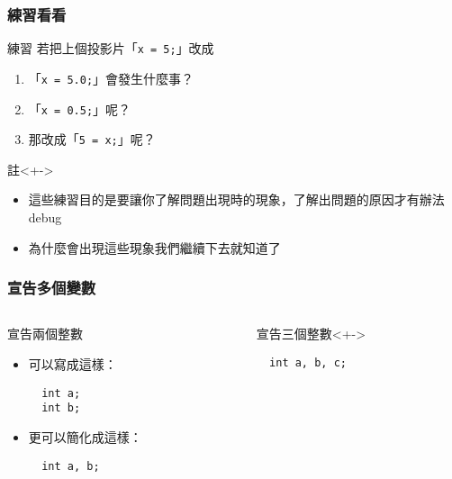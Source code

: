 \documentclass[utf8]{beamer}
\begin{document}
\begin{CJK}{UTF8}{bkai}
\begin{frame}
  \frametitle{練習看看}
  \begin{block}{練習}
    若把上個投影片「\lstinline{x = 5;}{}」改成
    \begin{enumerate}[<+->]
    \item 「\lstinline{x = 5.0;}{}」會發生什麼事？
    \item 「\lstinline{x = 0.5;}{}」呢？
    \item 那改成「\lstinline{5 = x;}{}」呢？
    \end{enumerate}
  \end{block}
  \begin{exampleblock}{註}<+->
    \begin{itemize}
      \item 這些練習目的是要讓你了解\alert{問題出現時}的現象，了解出問題的原因才有辦法 debug
      \item<+-> 為什麼會出現這些現象我們繼續下去就知道了
    \end{itemize}
  \end{exampleblock}
\end{frame}

\begin{frame}[fragile]
  \frametitle{宣告多個變數}
  \begin{columns}[T]
    \begin{column}[T]{5cm}
    \begin{block}{宣告兩個整數}
      \begin{itemize}[<+->]
      \item 可以寫成這樣：
        \begin{lstlisting}
  int a;
  int b;
        \end{lstlisting}
      \item 更可以簡化成這樣：
        \begin{lstlisting}
  int a, b;
        \end{lstlisting}
      \end{itemize}
    \end{block}
    \end{column}
    \begin{column}[T]{5cm}
    \begin{exampleblock}{宣告三個整數}<+->
      \begin{lstlisting}
  int a, b, c;
      \end{lstlisting}
    \end{exampleblock}
    \end{column}
  \end{columns}
\end{frame}


\end{CJK}
\end{document}
